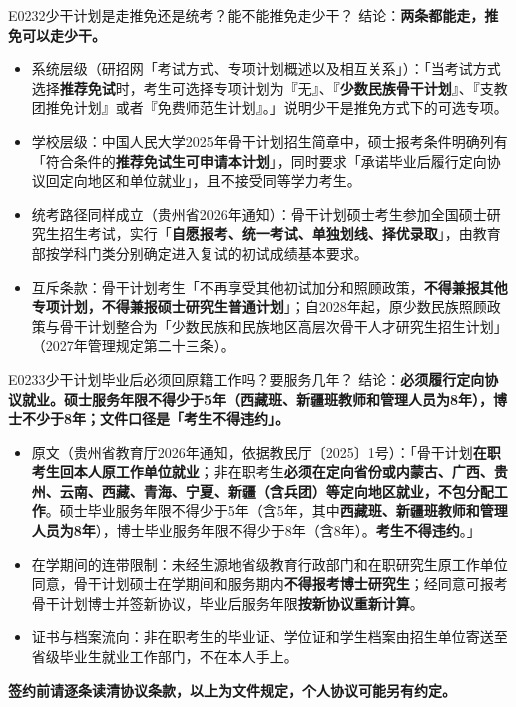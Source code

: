 \begin{qa}{E0232}{少干计划是走推免还是统考？能不能推免走少干？}
结论：\textbf{两条都能走，推免可以走少干。}
\begin{itemize}
  \item 系统层级（研招网「考试方式、专项计划概述以及相互关系」）：「当考试方式选择\textbf{推荐免试}时，考生可选择专项计划为『无』、『\textbf{少数民族骨干计划}』、『支教团推免计划』或者『免费师范生计划』。」说明少干是推免方式下的可选专项。
  \item 学校层级：中国人民大学2025年骨干计划招生简章中，硕士报考条件明确列有「符合条件的\textbf{推荐免试生可申请本计划}」，同时要求「承诺毕业后履行定向协议回定向地区和单位就业」，且不接受同等学力考生。
  \item 统考路径同样成立（贵州省2026年通知）：骨干计划硕士考生参加全国硕士研究生招生考试，实行「\textbf{自愿报考、统一考试、单独划线、择优录取}」，由教育部按学科门类分别确定进入复试的初试成绩基本要求。
  \item 互斥条款：骨干计划考生「不再享受其他初试加分和照顾政策，\textbf{不得兼报其他专项计划，不得兼报硕士研究生普通计划}」；自2028年起，原少数民族照顾政策与骨干计划整合为「少数民族和民族地区高层次骨干人才研究生招生计划」（2027年管理规定第二十三条）。
\end{itemize}
\end{qa}

\begin{qa}{E0233}{少干计划毕业后必须回原籍工作吗？要服务几年？}
结论：\textbf{必须履行定向协议就业。硕士服务年限不得少于5年（西藏班、新疆班教师和管理人员为8年），博士不少于8年；文件口径是「考生不得违约」。}
\begin{itemize}
  \item 原文（贵州省教育厅2026年通知，依据教民厅〔2025〕1号）：「骨干计划\textbf{在职考生回本人原工作单位就业}；非在职考生\textbf{必须在定向省份或内蒙古、广西、贵州、云南、西藏、青海、宁夏、新疆（含兵团）等定向地区就业，不包分配工作}。硕士毕业服务年限不得少于5年（含5年，其中\textbf{西藏班、新疆班教师和管理人员为8年}），博士毕业服务年限不得少于8年（含8年）。\textbf{考生不得违约}。」
  \item 在学期间的连带限制：未经生源地省级教育行政部门和在职研究生原工作单位同意，骨干计划硕士在学期间和服务期内\textbf{不得报考博士研究生}；经同意可报考骨干计划博士并签新协议，毕业后服务年限\textbf{按新协议重新计算}。
  \item 证书与档案流向：非在职考生的毕业证、学位证和学生档案由招生单位寄送至省级毕业生就业工作部门，不在本人手上。
\end{itemize}
\textbf{签约前请逐条读清协议条款，以上为文件规定，个人协议可能另有约定。}
\end{qa}

